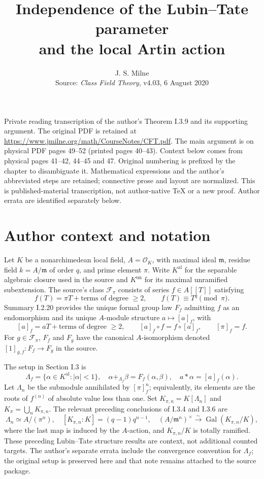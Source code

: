 \documentclass[11pt]{article}
\title{Independence of the Lubin--Tate parameter\\and the local Artin action}
\author{J. S. Milne\\\small Source: \emph{Class Field Theory}, v4.03, 6 August 2020}
\date{}
\newcommand{\un}{\mathrm{un}}
\newcommand{\al}{\mathrm{al}}
\newcommand{\Gal}{\operatorname{Gal}}
\newcommand{\m}{\mathfrak m}
\newcommand{\terms}[1]{\text{terms of degree }\geq #1}
\begin{document}
\maketitle
\noindent\small
Private reading transcription of the author's Theorem I.3.9 and its supporting argument.
The original PDF is retained at
\url{https://www.jmilne.org/math/CourseNotes/CFT.pdf}.
The main argument is on physical PDF pages 49--52 (printed pages 40--43).
Context below comes from physical pages 41--42, 44--45 and 47.
Original numbering is prefixed by the chapter to disambiguate it.
Mathematical expressions and the author's abbreviated steps are retained;
connective prose and layout are normalized. This is published-material transcription,
not author-native TeX or a new proof. Author errata are identified separately below.
\normalsize

\section*{Author context and notation}
Let $K$ be a nonarchimedean local field, $A=\mathcal O_K$, with maximal ideal
$\m$, residue field $k=A/\m$ of order $q$, and prime element $\pi$.
Write $K^{\al}$ for the separable algebraic closure used in the source and
$K^{\un}$ for its maximal unramified subextension.
The source's class $\mathcal F_\pi$ consists of series $f\in A[[T]]$ satisfying
\[
 f(T)=\pi T+\terms{2},\qquad f(T)\equiv T^q\pmod\pi.
\]
Summary I.2.20 provides the unique formal group law $F_f$ admitting $f$ as an
endomorphism and its unique $A$-module structure $a\mapsto[a]_f$, with
\[
 [a]_f=aT+\terms{2},\qquad [a]_f\circ f=f\circ[a]_f,\qquad [\pi]_f=f.
\]
For $g\in\mathcal F_\pi$, $F_f$ and $F_g$ have the canonical $A$-isomorphism
denoted $[1]_{g,f}:F_f\longrightarrow F_g$ in the source.

The setup in Section I.3 is
\[
 \Lambda_f=\{\alpha\in K^{\al}:|\alpha|<1\},\quad
 \alpha+_{\Lambda_f}\beta=F_f(\alpha,\beta),\quad
 a*\alpha=[a]_f(\alpha).
\]
Let $\Lambda_n$ be the submodule annihilated by $[\pi]_f^n$; equivalently,
its elements are the roots of $f^{(n)}$ of absolute value less than one.
Set $K_{\pi,n}=K[\Lambda_n]$ and $K_\pi=\bigcup_nK_{\pi,n}$.
The relevant preceding conclusions of I.3.4 and I.3.6 are
\[
 \Lambda_n\simeq A/(\pi^n),\quad
 [K_{\pi,n}:K]=(q-1)q^{n-1},\quad
 (A/\m^n)^\times\xrightarrow{\sim}\Gal(K_{\pi,n}/K),
\]
where the last map is induced by the $A$-action, and $K_{\pi,n}/K$ is totally ramified.
These preceding Lubin--Tate structure results are context, not additional counted targets.
The author's separate errata include the convergence convention for $\Lambda_f$;
the original setup is preserved here and that note remains attached to the source package.
\end{document}
